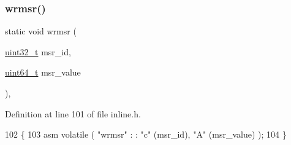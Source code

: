 \subsubsection{\texorpdfstring{wrmsr()}{wrmsr()}}
{\footnotesize\ttfamily static void wrmsr (\begin{DoxyParamCaption}\item[{\hyperlink{a00068_a435d1572bf3f880d55459d9805097f62_a435d1572bf3f880d55459d9805097f62}{uint32\+\_\+t}}]{msr\+\_\+id,  }\item[{\hyperlink{a00068_aa232ecf786a74ce5363c36c10798d2b1_aa232ecf786a74ce5363c36c10798d2b1}{uint64\+\_\+t}}]{msr\+\_\+value }\end{DoxyParamCaption})\hspace{0.3cm}{\ttfamily [inline]}, {\ttfamily [static]}}



Definition at line 101 of file inline.\+h.


\begin{DoxyCode}
102 \{
103     \textcolor{keyword}{asm} \textcolor{keyword}{volatile} ( \textcolor{stringliteral}{"wrmsr"} : : \textcolor{stringliteral}{"c"} (msr\_id), \textcolor{stringliteral}{"A"} (msr\_value) );
104 \}
\end{DoxyCode}
